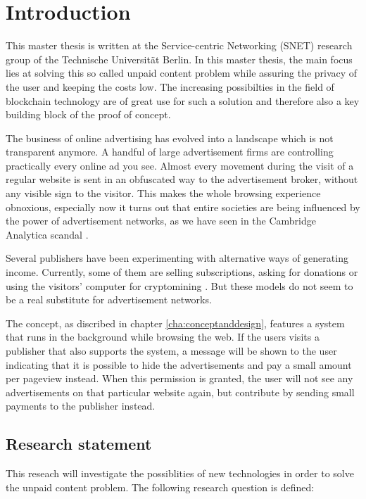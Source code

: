 \chapter{Introduction}
\label{cha:introduction}

This master thesis is written at the Service-centric Networking (SNET) research group of the Technische Universität Berlin. 
In this master thesis, the main focus lies at solving this so called unpaid content problem while assuring the privacy of the user and keeping the costs low. The increasing possibilties in the field of blockchain technology are of great use for such a solution and therefore also a key building block of the proof of concept.

The business of online advertising has evolved into a landscape which is not transparent anymore. A handful of large advertisement firms are controlling practically every online ad you see. Almost every movement during the visit of a regular website is sent in an obfuscated way to the advertisement broker, without any visible sign to the visitor. This makes the whole browsing experience obnoxious, especially now it turns out that entire societies are being influenced by the power of advertisement networks, as we have seen in the Cambridge Analytica scandal \cite{FakeWebPage11}.

Several publishers have been experimenting with alternative ways of generating income. Currently, some of them are selling subscriptions, asking for donations or using the visitors' computer for cryptomining \cite{ruth2018digging}. But these models do not seem to be a real substitute for advertisement networks. 

The concept, as discribed in chapter \ref{cha:conceptanddesign}, features a system that runs in the background while browsing the web. If the users visits a publisher that also supports the system, a message will be shown to the user indicating that it is possible to hide the advertisements and pay a small amount per pageview instead. When this permission is granted, the user will not see any advertisements on that particular website again, but contribute by sending small payments to the publisher instead.

\section{Research statement}

This reseach will investigate the possiblities of new technologies in order to solve the unpaid content problem. The following research question is defined:
\vspace{1em}

